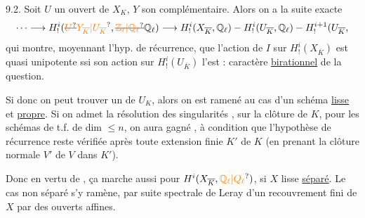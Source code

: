 9.2.    Soit $U$ un ouvert   de $X_K$, $Y$ son complémentaire. Alors on a la suite exacte
\[
\cdots\longrightarrow H^i_!(\deleted{\unsure{U}}\unsure{Y_{\overline K}|U_{\overline K}},\deleted{\unsure{\mathbb Z_\ell|\mathbb Q_\ell}}\mathbb Q_\ell)\longrightarrow H^i_!(X_{\overline K},\mathbb Q_\ell)-H^i_!(U_{\overline K},\mathbb Q_\ell)-H^{i+1}_!(U_{\overline K},
\]
qui montre, moyennant l'hyp. de récurrence, que
l'action de $I$ sur $H^i_!(X_{\overline K})$ est quasi unipotente ssi son action sur $H^i_!(U_{\overline K})$ l'est : caractère \uline{birationnel} de la question.

Si donc on peut trouver un    de  $U_K$, alors on est ramené au cas d'un schéma \uline{lisse} et \uline{propre}. Si on admet la résolution des singularités  , sur la clôture   de $K$, pour les schémas de t.f. de dim $\leq n$, on aura gagné , à condition que l'hypothèse de récurrence reste vérifiée après toute extension  finie  $K'$ de $K$ (en prenant la clôture normale $V'$ de $V$ dans $K'$).

 Donc en vertu de  , ça marche aussi pour $H^i(X_{\overline K},\unsure{\mathbb Q_\ell|Q_\ell})$, si $X$ lisse \uline{séparé}. Le cas non séparé s'y ramène, par suite spectrale de Leray d'un recouvrement fini de $X$ par des ouverts affines.


